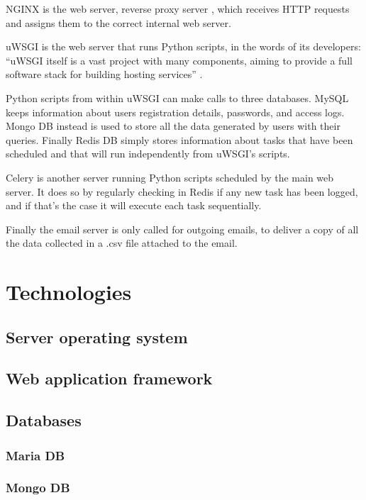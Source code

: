NGINX is the web server, reverse proxy server \cite{WikiNginx}, which receives
HTTP requests and assigns them to the correct internal web server.

uWSGI is the web server that runs Python scripts, in the words of its
developers: ``uWSGI itself is a vast project with many components, aiming to
provide a full software stack for building hosting services'' \cite{RtduWsgi}.

Python scripts from within uWSGI can make calls to three databases. MySQL keeps
information about users registration details, passwords, and access logs. Mongo
DB instead is used to store all the data generated by users with their queries.
Finally Redis DB simply stores information about tasks that have been scheduled
and that will run independently from uWSGI's scripts.

Celery is another server running Python scripts scheduled by the main web
server. It does so by regularly checking in Redis if any new task has been
logged, and if that's the case it will execute each task sequentially.

Finally the email server is only called for outgoing emails, to deliver a copy
of all the data collected in a .csv file attached to the email.

\section{Technologies}

\subsection{Server operating system}

\subsection{Web application framework}

\subsection{Databases}

\subsubsection{Maria DB}

\subsubsection{Mongo DB}


